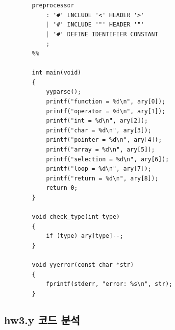 \documentclass{article}
\begin{document}
\begin{lstlisting}
		preprocessor
			: '#' INCLUDE '<' HEADER '>'
			| '#' INCLUDE '"' HEADER '"'
			| '#' DEFINE IDENTIFIER CONSTANT
			;
		%%
		
		int main(void)
		{
			yyparse();
			printf("function = %d\n", ary[0]);
			printf("operator = %d\n", ary[1]);
			printf("int = %d\n", ary[2]);
			printf("char = %d\n", ary[3]);
			printf("pointer = %d\n", ary[4]);
			printf("array = %d\n", ary[5]);
			printf("selection = %d\n", ary[6]);
			printf("loop = %d\n", ary[7]);
			printf("return = %d\n", ary[8]);
			return 0;
		}
		
		void check_type(int type)
		{
			if (type) ary[type]--;
		}
		
		void yyerror(const char *str)
		{
			fprintf(stderr, "error: %s\n", str);
		}
\end{lstlisting}
\subsection{hw3.y 코드 분석}
\end{document}
